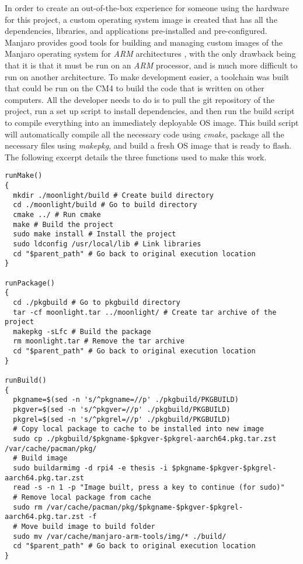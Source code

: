 In order to create an out-of-the-box experience for someone using the hardware for this project, a custom operating system image is created that has all the dependencies, libraries, and applications pre-installed and pre-configured.
Manjaro provides good tools for building and managing custom images of the Manjaro operating system for \emph{ARM} architectures \cite{manjaro_arm_tools}, with the only drawback being that it is that it must be run on an \emph{ARM} processor, and is much more difficult to run on another architecture.
To make development easier, a toolchain was built that could be run on the CM4 to build the code that is written on other computers.
All the developer needs to do is to pull the git repository of the project, run a set up script to install dependencies, and then run the build script to compile everything into an immediately deployable OS image.
This build script will automatically compile all the necessary code using \emph{cmake}, package all the necessary files using \emph{makepkg}, and build a fresh OS image that is ready to flash.
The following excerpt details the three functions used to make this work.

\begin{lstlisting}[style=custombash,firstnumber=50,title=Excerpt from \emph{/scripts/build.sh}]
runMake()
{
  mkdir ./moonlight/build # Create build directory
  cd ./moonlight/build # Go to build directory
  cmake ../ # Run cmake
  make # Build the project
  sudo make install # Install the project
  sudo ldconfig /usr/local/lib # Link libraries
  cd "$parent_path" # Go back to original execution location
}

runPackage()
{
  cd ./pkgbuild # Go to pkgbuild directory
  tar -cf moonlight.tar ../moonlight/ # Create tar archive of the project
  makepkg -sLfc # Build the package
  rm moonlight.tar # Remove the tar archive
  cd "$parent_path" # Go back to original execution location
}

runBuild()
{
  pkgname=$(sed -n 's/^pkgname=//p' ./pkgbuild/PKGBUILD)
  pkgver=$(sed -n 's/^pkgver=//p' ./pkgbuild/PKGBUILD)
  pkgrel=$(sed -n 's/^pkgrel=//p' ./pkgbuild/PKGBUILD)
  # Copy local package to cache to be installed into new image
  sudo cp ./pkgbuild/$pkgname-$pkgver-$pkgrel-aarch64.pkg.tar.zst /var/cache/pacman/pkg/
  # Build image
  sudo buildarmimg -d rpi4 -e thesis -i $pkgname-$pkgver-$pkgrel-aarch64.pkg.tar.zst
  read -s -n 1 -p "Image built, press a key to continue (for sudo)"
  # Remove local package from cache
  sudo rm /var/cache/pacman/pkg/$pkgname-$pkgver-$pkgrel-aarch64.pkg.tar.zst -f
  # Move build image to build folder
  sudo mv /var/cache/manjaro-arm-tools/img/* ./build/
  cd "$parent_path" # Go back to original execution location
}
\end{lstlisting}

